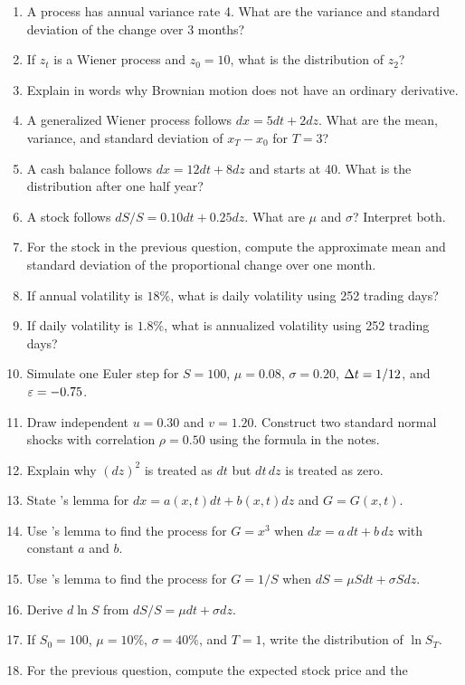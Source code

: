 \begin{enumerate}
    \item A process has annual variance rate 4. What are the variance and
    standard deviation of the change over 3 months?
    \item If $z_t$ is a Wiener process and $z_0=10$, what is the distribution
    of $z_2$?
    \item Explain in words why Brownian motion does not have an ordinary
    derivative.
    \item A generalized Wiener process follows $dx=5dt+2dz$. What are the mean,
    variance, and standard deviation of $x_T-x_0$ for $T=3$?
    \item A cash balance follows $dx=12dt+8dz$ and starts at 40. What is the
    distribution after one half year?
    \item A stock follows $dS/S=0.10dt+0.25dz$. What are $\mu$ and $\sigma$?
    Interpret both.
    \item For the stock in the previous question, compute the approximate mean
    and standard deviation of the proportional change over one month.
    \item If annual volatility is $18\%$, what is daily volatility using 252
    trading days?
    \item If daily volatility is $1.8\%$, what is annualized volatility using
    252 trading days?
    \item Simulate one Euler step for $S=100$, $\mu=0.08$, $\sigma=0.20$,
    $\Delta t=1/12$, and $\varepsilon=-0.75$.
    \item Draw independent $u=0.30$ and $v=1.20$. Construct two standard normal
    shocks with correlation $\rho=0.50$ using the formula in the notes.
    \item Explain why $(dz)^2$ is treated as $dt$ but $dt\,dz$ is treated as
    zero.
    \item State \Ito's lemma for $dx=a(x,t)dt+b(x,t)dz$ and $G=G(x,t)$.
    \item Use \Ito's lemma to find the process for $G=x^3$ when $dx=a\,dt+b\,dz$
    with constant $a$ and $b$.
    \item Use \Ito's lemma to find the process for $G=1/S$ when
    $dS=\mu Sdt+\sigma Sdz$.
    \item Derive $d\ln S$ from $dS/S=\mu dt+\sigma dz$.
    \item If $S_0=100$, $\mu=10\%$, $\sigma=40\%$, and $T=1$, write the
    distribution of $\ln S_T$.
    \item For the previous question, compute the expected stock price and the

\end{enumerate}
